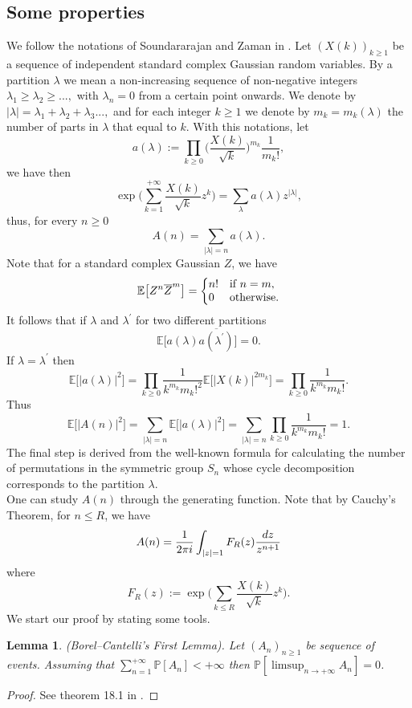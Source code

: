 \documentclass{article}
\newtheorem{lemma}[theorem]{Lemma}
\begin{document}
\subsection{Some properties}
We follow the notations of Soundararajan and Zaman in \cite{model_zaman}. Let $(X(k))_{k\geqslant 1}$ be a sequence of independent standard complex Gaussian random variables. By a partition $\lambda $ we mean a non-increasing sequence of non-negative integers $\lambda_1 \geqslant \lambda_2 \geqslant ...,$ with $\lambda_n =0$ from a certain point onwards. We denote by $|\lambda| = \lambda_1 + \lambda_2 + \lambda_3 ...,$ and for each integer $k \geqslant 1$ we denote by $m_k=m_k(\lambda)$ the number of parts in $\lambda$ that equal to $k$. 
With this notations, let
\begin{equation}\label{a(lambda)_def}
    a(\lambda):= \prod_{k\geqslant 0} \bigg( \frac{X(k)}{\sqrt{k}}\bigg)^{m_k} \frac{1}{m_k! },
\end{equation}
we have then
$$
\exp\bigg( \sum_{k=1}^{+\infty} \frac{X(k)}{\sqrt{k}}z^k \bigg)= \sum_{\lambda} a(\lambda) z^{|\lambda|},
$$
thus, for every $n\geqslant 0$
$$
A(n)=\sum_{|\lambda|=n} a(\lambda).
$$
Note that for a standard complex Gaussian $Z$, we have
$$
\mathbb{E}\big[Z^n \overline{Z}^m\big]=\left\{
  \begin{array}{@{}ll@{}}
    n!  & \text{if}\ n =m, \\
    0 & \text{otherwise.}
  \end{array}\right.
$$
It follows that if $\lambda$ and $\lambda^{\prime}$ for two different partitions 
$$
\mathbb{E}\big[a(\lambda)\overline{a(\lambda^{\prime})} \big] =0.
$$
If $\lambda=\lambda^{\prime}$ then
$$\mathbb{E}\big[ |a(\lambda)|^2\big]=\prod_{k\geqslant 0}  \frac{1}{k^{m_k}m_k!^2} \mathbb{E}\big[|X(k)|^{2m_k}\big]= \prod_{k\geqslant 0}  \frac{1}{k^{m_k}m_k!}.$$
Thus
$$
\mathbb{E}\big[ |A(n)|^2\big] = \sum_{|\lambda|=n} \mathbb{E}\big[|a(\lambda)|^2\big] =\sum_{|\lambda|=n} \prod_{k\geqslant 0}  \frac{1}{k^{m_k}m_k!} =1.
$$
The final step is derived from the well-known formula for calculating the number of permutations in the symmetric group $S_n$ whose cycle decomposition corresponds to the partition $\lambda$.\\
One can study $A(n)$ through the generating function. Note that by Cauchy's Theorem, for $n\leqslant R$, we have
$$
A(n)= \frac{1}{2 \pi i}\int_{|z|=1} F_R(z)\frac{{\rm d}z}{z^{n+1}}
$$
where 
\begin{equation}\label{F_K}
    F_R(z):= \exp\bigg(\sum_{k\leqslant R} \frac{X(k)}{\sqrt{k}}z^k\bigg).
\end{equation}
We start our proof by stating some tools.
\begin{lemma}{(Borel--Cantelli's First Lemma).} \label{borelcantelli} Let $(A_n)_{n \geqslant 1}$ be sequence of events. Assuming that $\sum_{n=1}^{+ \infty}\mathbb{P}[A_n] < + \infty $ then $\mathbb{P}[\limsup_{n \to + \infty} A_n]=0$.

\end{lemma}
\begin{proof}[Proof]
See theorem 18.1 in \cite{Gut}.
\end{proof}
\end{document}
